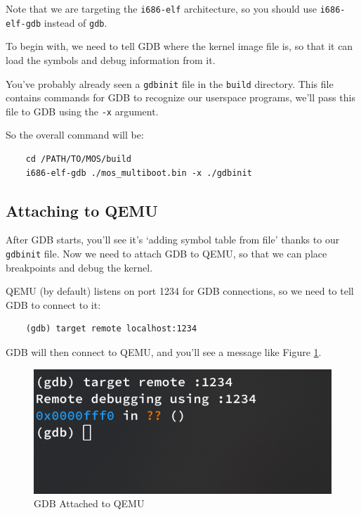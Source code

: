 Note that we are targeting the \texttt{i686-elf} architecture, so you should use \texttt{i686-elf-gdb}
instead of \texttt{gdb}.

To begin with, we need to tell GDB where the kernel image file is, so that it can load the symbols
and debug information from it.

You've probably already seen a \texttt{gdbinit} file in the \texttt{build} directory. This file
contains commands for GDB to recognize our userspace programs, we'll pass this file to GDB using
the \texttt{-x} argument.

So the overall command will be:

\begin{verbatim}
    cd /PATH/TO/MOS/build
    i686-elf-gdb ./mos_multiboot.bin -x ./gdbinit
\end{verbatim}

\subsection{Attaching to QEMU} \label{sec:gdb-attach}

After GDB starts, you'll see it's `adding symbol table from file' thanks to our \texttt{gdbinit} file.
Now we need to attach GDB to QEMU, so that we can place breakpoints and debug the kernel.

QEMU (by default) listens on port 1234 for GDB connections, so we need to tell GDB to connect to it:

\begin{verbatim}
    (gdb) target remote localhost:1234
\end{verbatim}

GDB will then connect to QEMU, and you'll see a message like Figure \ref{fig:gdb-attached}.

\begin{figure}[h]
    \centering
    \includegraphics[width=\textwidth]{assets/c1.gdb-attached.png}
    \caption{GDB Attached to QEMU}
    \label{fig:gdb-attached}
\end{figure}

